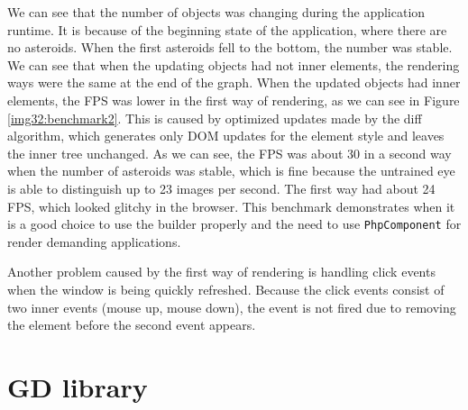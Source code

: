 \par
We can see that the number of objects was changing during the application runtime.
It is because of the beginning state of the application, where there are no asteroids.
When the first asteroids fell to the bottom, the number was stable.
We can see that when the updating objects had not inner elements, the rendering ways were the same at the end of the graph.
When the updated objects had inner elements, the FPS was lower in the first way of rendering, as we can see in Figure \ref{img32:benchmark2}.
This is caused by optimized updates made by the diff algorithm, which generates only DOM updates for the element style and leaves the inner tree unchanged.
As we can see, the FPS was about 30 in a second way when the number of asteroids was stable, which is fine because the untrained eye is able to distinguish up to 23 images per second.
The first way had about 24 FPS, which looked glitchy in the browser.
This benchmark demonstrates when it is a good choice to use the builder properly and the need to use \texttt{PhpComponent} for render demanding applications.
\par
Another problem caused by the first way of rendering is handling click events when the window is being quickly refreshed.
Because the click events consist of two inner events (mouse up, mouse down), the event is not fired due to removing the element before the second event appears.

\section{GD library}

